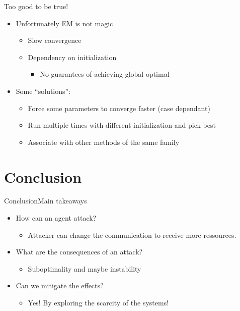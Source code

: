 \documentclass[aspectratio=169]{beamer}
\begin{document}
\begin{frame}{Too good to be true!}{}
  \begin{itemize}[<+(1)->]
    \item Unfortunately EM is not magic
          \begin{itemize}
            \item Slow convergence
            \item Dependency on initialization
                  \begin{itemize}
                    \item No guarantees of achieving global optimal
                  \end{itemize}
          \end{itemize}
    \item Some ``solutions'':
          \begin{itemize}
            \item Force some parameters to converge faster (case dependant)
            \item Run multiple times with different initialization and pick best
            \item Associate with other methods of the same family
          \end{itemize}
  \end{itemize}
\end{frame}

\section{Conclusion}

\begin{frame}{Conclusion}{Main takeaways}
  \begin{itemize}
    \item How can an agent attack? 
  \begin{itemize}
    \item<2-> Attacker can change the communication to receive more ressources.
  \end{itemize}
    \item What are the consequences of an attack? 
  \begin{itemize}
    \item<4-> Suboptimality and maybe instability
  \end{itemize}
    \item Can we mitigate the effects? 
  \begin{itemize}
          \item<6-> Yes! By exploring the scarcity of the systems!
  \end{itemize}
  \end{itemize}
\end{frame}
\end{document}

